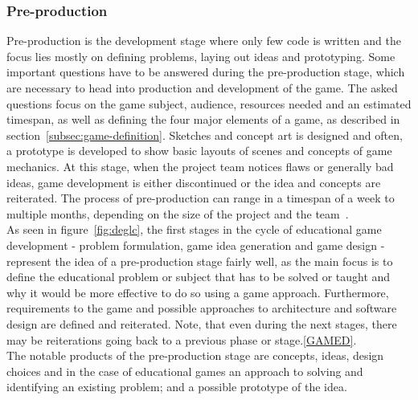 \subsubsection{Pre-production}\label{subsubsec:pre-production}
Pre-production is the development stage where only few code is written and the focus lies mostly on defining
problems, laying out ideas and prototyping.
Some important questions have to be answered during the pre-production stage, which are necessary to
head into production and development of the game.
The asked questions focus on the game subject, audience, resources needed and an estimated timespan, as well as
defining the four major elements of a game, as described in section~\ref{subsec:game-definition}.
Sketches and concept art is designed and often, a prototype is developed to show basic layouts of scenes and concepts of game mechanics.
At this stage, when the project team notices flaws or generally bad ideas, game development is either discontinued or the idea and concepts are
reiterated.
The process of pre-production can range in a timespan of a week to multiple months, depending on the size of the project and
the team~\cite{cg:game-design-stages}.
\\
As seen in figure~\ref{fig:deglc}, the first stages in the cycle of educational game development - problem formulation, game idea generation and game design
- represent the idea of a pre-production stage fairly well,
as the main focus is to define the educational problem or subject that has to be solved or taught and why it would be more effective
to do so using a game approach.
Furthermore, requirements to the game and possible approaches to architecture and software design are defined and reiterated.
Note, that even during the next stages, there may be reiterations going back to a previous phase or stage.\ref{GAMED}.
\\
The notable products of the pre-production stage are concepts, ideas, design choices and in the case of educational games an approach to solving and identifying
an existing problem;
and a possible prototype of the idea.

